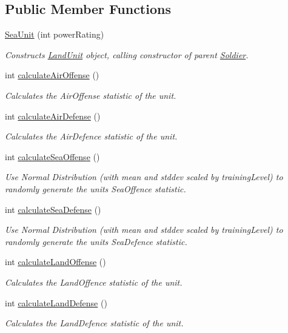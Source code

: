 \subsection*{Public Member Functions}
\begin{DoxyCompactItemize}
\item 
\mbox{\hyperlink{class_sea_unit_aec91d0cb64b9d4f89a352d68397038b0}{Sea\+Unit}} (int power\+Rating)
\begin{DoxyCompactList}\small\item\em Constructs \mbox{\hyperlink{class_land_unit}{Land\+Unit}} object, calling constructor of parent \mbox{\hyperlink{class_soldier}{Soldier}}. \end{DoxyCompactList}\item 
int \mbox{\hyperlink{class_sea_unit_aa2d92acd5e3798fdddfa860d5a9d346b}{calculate\+Air\+Offense}} ()
\begin{DoxyCompactList}\small\item\em Calculates the Air\+Offense statistic of the unit. \end{DoxyCompactList}\item 
int \mbox{\hyperlink{class_sea_unit_ab05ac5cd7be62a139c16f36146c17b00}{calculate\+Air\+Defense}} ()
\begin{DoxyCompactList}\small\item\em Calculates the Air\+Defence statistic of the unit. \end{DoxyCompactList}\item 
int \mbox{\hyperlink{class_sea_unit_a3c275db4b9bf8cef62975d6c26ce79f8}{calculate\+Sea\+Offense}} ()
\begin{DoxyCompactList}\small\item\em Use Normal Distribution (with mean and stddev scaled by training\+Level) to randomly generate the unit\textquotesingle{}s Sea\+Offence statistic. \end{DoxyCompactList}\item 
int \mbox{\hyperlink{class_sea_unit_a04480810f175b4c0c7d5b54e9397605f}{calculate\+Sea\+Defense}} ()
\begin{DoxyCompactList}\small\item\em Use Normal Distribution (with mean and stddev scaled by training\+Level) to randomly generate the unit\textquotesingle{}s Sea\+Defence statistic. \end{DoxyCompactList}\item 
int \mbox{\hyperlink{class_sea_unit_a5b21e648106a6ec40c79a1916e9fe674}{calculate\+Land\+Offense}} ()
\begin{DoxyCompactList}\small\item\em Calculates the Land\+Offence statistic of the unit. \end{DoxyCompactList}\item 
int \mbox{\hyperlink{class_sea_unit_a5fa9cb7bedbe58346fcd22fdd7ca855b}{calculate\+Land\+Defense}} ()
\begin{DoxyCompactList}\small\item\em Calculates the Land\+Defence statistic of the unit. \end{DoxyCompactList}\end{DoxyCompactItemize}
